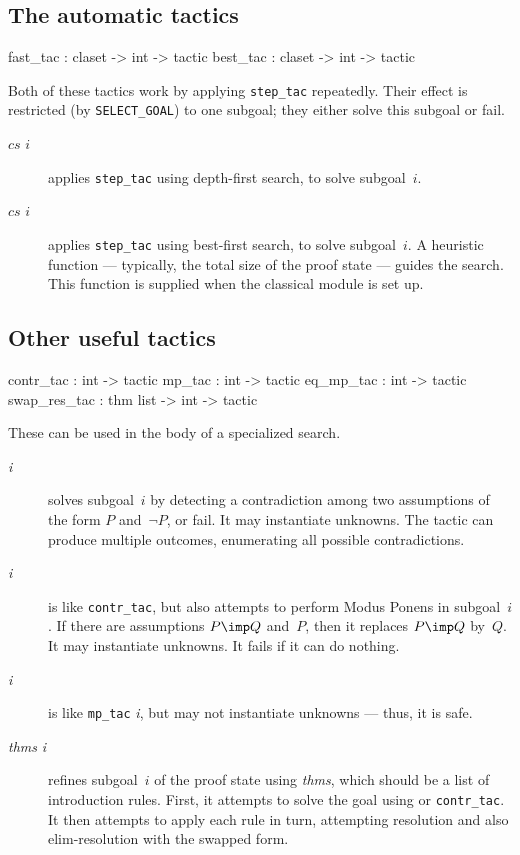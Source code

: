 \subsection{The automatic tactics}
\begin{ttbox} 
fast_tac : claset -> int -> tactic
best_tac : claset -> int -> tactic
\end{ttbox}
Both of these tactics work by applying {\tt step_tac} repeatedly.  Their
effect is restricted (by {\tt SELECT_GOAL}) to one subgoal; they either
solve this subgoal or fail.
\begin{description}
\item[ $cs$ $i$] applies {\tt step_tac} using
depth-first search, to solve subgoal~$i$.

\item[ $cs$ $i$] applies {\tt step_tac} using
best-first search, to solve subgoal~$i$.  A heuristic function ---
typically, the total size of the proof state --- guides the search.  This
function is supplied when the classical module is set up.
\end{description}


\subsection{Other useful tactics}
\begin{ttbox} 
contr_tac    :             int -> tactic
mp_tac       :             int -> tactic
eq_mp_tac    :             int -> tactic
swap_res_tac : thm list -> int -> tactic
\end{ttbox}
These can be used in the body of a specialized search.
\begin{description}
\item[ {\it i}] solves subgoal~$i$ by detecting a
contradiction among two assumptions of the form $P$ and~$\neg P$, or fail.
It may instantiate unknowns.  The tactic can produce multiple outcomes,
enumerating all possible contradictions.

\item[ {\it i}] 
is like {\tt contr_tac}, but also attempts to perform Modus Ponens in
subgoal~$i$.  If there are assumptions $P\imp Q$ and~$P$, then it replaces
$P\imp Q$ by~$Q$.  It may instantiate unknowns.  It fails if it can do
nothing.

\item[ {\it i}] 
is like {\tt mp_tac} {\it i}, but may not instantiate unknowns --- thus, it
is safe.

\item[ {\it thms} {\it i}] refines subgoal~$i$ of
the proof state using {\it thms}, which should be a list of introduction
rules.  First, it attempts to solve the goal using  or
{\tt contr_tac}.  It then attempts to apply each rule in turn, attempting
resolution and also elim-resolution with the swapped form.
\end{description}


